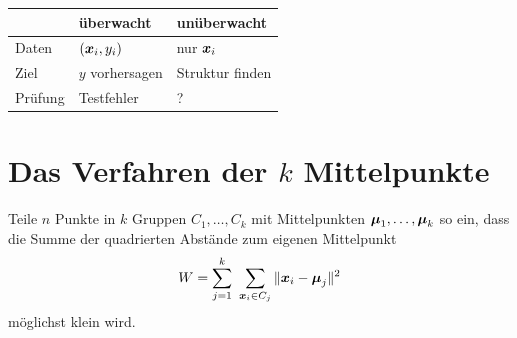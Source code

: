 \begin{merksatz}
\begin{center}
{\small
\renewcommand{\arraystretch}{1.55}
\begin{tabular}{@{}P{2.6cm}P{3.0cm}P{3.0cm}@{}}
\toprule
& \textbf{überwacht} & \textbf{unüberwacht}\\
\midrule
Daten & $(\boldsymbol{x}_i, y_i)$ & nur $\boldsymbol{x}_i$\\
Ziel & $y$ vorhersagen & Struktur finden\\
Prüfung & Testfehler & \textcolor{akzent}{?}\\
\bottomrule
\end{tabular}}
\end{center}

\begin{center}
\begin{minipage}{0.88\textwidth}
\end{minipage}
\end{center}
\end{merksatz}

\section{Das Verfahren der $k$ Mittelpunkte}

\begin{definition}
Teile $n$ Punkte in $k$ Gruppen $C_1,\ldots,C_k$ mit Mittelpunkten $\boldsymbol{\mu}_1,\ldots,\boldsymbol{\mu}_k$ so ein, dass die Summe der quadrierten Abstände zum eigenen Mittelpunkt
\[ W = \sum_{j=1}^{k}\ \sum_{\boldsymbol{x}_i\in C_j} \|\boldsymbol{x}_i - \boldsymbol{\mu}_j\|^{2} \]
möglichst klein wird.
\end{definition}

